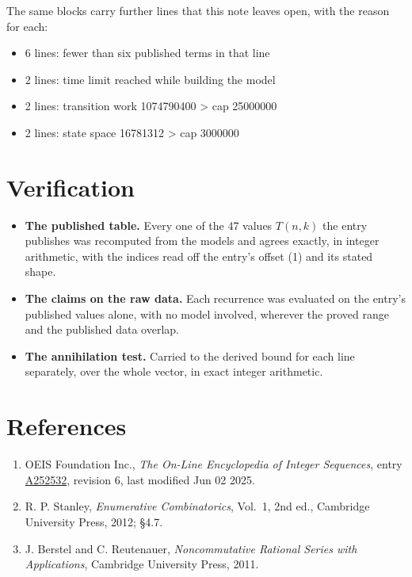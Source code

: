 \documentclass[11pt]{article}
\theoremstyle{definition}
\begin{document}
The same blocks carry further lines that this note leaves open, with the reason for each:

\begin{itemize}

\item 6 lines: fewer than six published terms in that line

\item 2 lines: time limit reached while building the model

\item 2 lines: transition work 1074790400 > cap 25000000

\item 2 lines: state space 16781312 > cap 3000000

\end{itemize}

\section{Verification}

\begin{itemize}

\item {\bfseries The published table.} Every one of the 47 values $T(n,k)$ the entry publishes was recomputed from the models and agrees exactly, in integer arithmetic, with the indices read off the entry's offset (1) and its stated shape.

\item {\bfseries The claims on the raw data.} Each recurrence was evaluated on the entry's published values alone, with no model involved, wherever the proved range and the published data overlap.

\item {\bfseries The annihilation test.} Carried to the derived bound for each line separately, over the whole vector, in exact integer arithmetic.

\end{itemize}

\section{References}

\begin{enumerate}

\item OEIS Foundation Inc., \emph{The On-Line Encyclopedia of Integer Sequences}, entry \href{https://oeis.org/A252532}{A252532}, revision 6, last modified Jun 02 2025.

\item R. P. Stanley, \emph{Enumerative Combinatorics}, Vol.~1, 2nd ed., Cambridge University Press, 2012; \S4.7.

\item J. Berstel and C. Reutenauer, \emph{Noncommutative Rational Series with Applications}, Cambridge University Press, 2011.

\end{enumerate}
\end{document}

